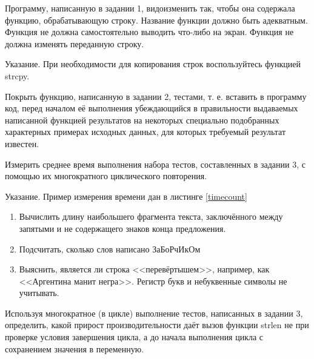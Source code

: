 \labtask

Программу, написанную в задании 1, видоизменить так, чтобы она содержала функцию, обрабатывающую строку.
Название функции должно быть адекватным.
Функция не должна самостоятельно выводить что-либо на экран.
Функция не должна изменять переданную строку.

Указание. При необходимости для копирования строк воспользуйтесь функцией strcpy.

\labtask

Покрыть функцию, написанную в задании 2, тестами,
т. е. вставить в программу код, перед началом её выполнения убеждающийся в правильности выдаваемых написанной функцией результатов
на некоторых специально подобранных характерных примерах исходных данных,
для которых требуемый результат известен.

\labtask

Измерить среднее время выполнения набора тестов, составленных в задании 3, с помощью их многократного циклического повторения.

Указание. Пример измерения времени дан в листинге \ref{timecount}


\reservedtasks

\begin{enumerate}
	\item
		Вычислить длину наибольшего фрагмента текста, заключённого между запятыми и не содержащего знаков конца предложения.
	\item
		Подсчитать, сколько слов написано ЗаБоРчИкОм
	\item
		Выяснить, является ли строка <<перевёртышем>>, например, как <<Аргентина манит негра>>.
		Регистр букв и небуквенные символы не учитывать.
\end{enumerate}


\labtask

Используя многократное (в цикле) выполнение тестов, написанных в задании 3, определить, какой прирост производительности даёт вызов функции strlen не при проверке условия завершения цикла, а до начала выполнения цикла с сохранением значения в переменную.



